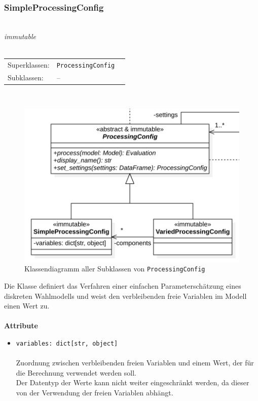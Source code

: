 \documentclass{article}
\begin{document}
\subsubsection*{\large{\textbf{SimpleProcessingConfig}\label{cls:SimpleProcessingConfig}}}\\
\textit{\flqq{}immutable\frqq}\normalsize\\\\
\begin{tabular}{lll}
 Superklassen: & \texttt{ProcessingConfig}\\
 Subklassen: & --
\end{tabular}\\
\begin{figure}[H]%
    \centering
    \includegraphics[width=13cm]{entwurf/Entwurf_dokument/img/cls/model/ProcessingConfigs.png}
    \caption{Klassendiagramm aller Subklassen von \texttt{ProcessingConfig}}
\end{figure}

Die Klasse definiert das Verfahren einer einfachen Parameterschätzung eines diskreten Wahlmodells und weist den verbleibenden freie Variablen im Modell einen Wert zu.
\\\\

\textbf{Attribute}
\begin{itemize}\setlength\itemsep{3em}
\item \texttt{variables: dict[str, object]}\\\\
Zuordnung zwischen verbleibenden freien Variablen und einem Wert, der für die Berechnung verwendet werden soll.\\
Der Datentyp der Werte kann nicht weiter eingeschränkt werden, da dieser von der Verwendung der freien Variablen abhängt.
\\\\
\end{itemize}
\end{document}
